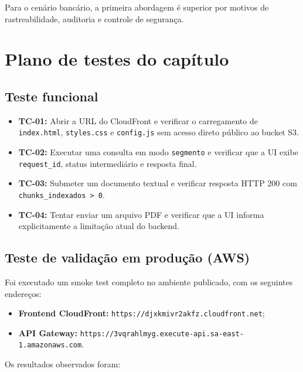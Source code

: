 Para o cen\'ario banc\'ario, a primeira abordagem \'e superior por motivos
de rastreabilidade, auditoria e controle de seguran\c{c}a.

\section{Plano de testes do cap\'itulo}

\subsection{Teste funcional}

\begin{itemize}[leftmargin=*]
  \item \textbf{TC-01:} Abrir a URL do CloudFront e verificar o
        carregamento de \texttt{index.html}, \texttt{styles.css} e
        \texttt{config.js} sem acesso direto p\'ublico ao bucket S3.
  \item \textbf{TC-02:} Executar uma consulta em modo \texttt{segmento}
        e verificar que a UI exibe \texttt{request\_id}, status intermedi\'ario
        e resposta final.
  \item \textbf{TC-03:} Submeter um documento textual e verificar resposta
        HTTP 200 com \texttt{chunks\_indexados > 0}.
  \item \textbf{TC-04:} Tentar enviar um arquivo PDF e verificar que a UI
        informa explicitamente a limita\c{c}\~ao atual do backend.
\end{itemize}

\subsection{Teste de valida\c{c}\~ao em produ\c{c}\~ao (AWS)}

Foi executado um smoke test completo no ambiente publicado, com os
seguintes endere\c{c}os:

\begin{itemize}[leftmargin=*]
  \item \textbf{Frontend CloudFront:}
        \texttt{https://djxkmivr2akfz.cloudfront.net};
  \item \textbf{API Gateway:}
        \texttt{https://3vqrahlmyg.execute-api.sa-east-1.amazonaws.com}.
\end{itemize}

Os resultados observados foram:

